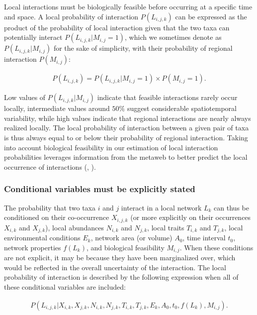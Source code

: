 Local interactions must be biologically feasible before occurring at a specific
time and space. A local probability of interaction $P(L_{i, j, k})$ can be
expressed as the product of the probability of local interaction given that the
two taxa can potentially interact $P(L_{i, j, k} | M_{i, j} = 1)$, which we
sometimes denote as $P(L_{i, j, k}|M_{i, j})$ for the sake of simplicity, with
their probability of regional interaction $P(M_{i, j})$: 

\begin{eqnarray}
  \label{eq:local_meta}
  P(L_{i, j, k}) = P(L_{i, j, k} | M_{i, j} = 1) \times P(M_{i, j} = 1).
\end{eqnarray}

Low values of $P(L_{i, j, k}|M_{i, j})$ indicate that feasible interactions
rarely occur locally, intermediate values around $50\%$ suggest considerable
spatiotemporal variability, while high values indicate that regional
interactions are nearly always realized locally. The local probability of
interaction between a given pair of taxa is thus always equal to or below their
probability of regional interaction. Taking into account biological feasibility
in our estimation of local interaction probabilities leverages information from
the metaweb to better predict the local occurrence of interactions
(\cite{Strydom2021Roadmapa}, \cite{Dansereau2024Spatially}).  

\subsubsection{Conditional variables must be explicitly stated} 

The probability that two taxa $i$ and $j$ interact in a local network $L_k$ can
thus be conditioned on their co-occurrence $X_{i,j,k}$ (or more explicitly on
their occurrences $X_{i,k}$ and $X_{j,k}$), local abundances $N_{i,k}$ and
$N_{j,k}$, local traits $T_{i,k}$ and $T_{j,k}$, local environmental conditions
$E_k$, network area (or volume) $A_0$, time interval $t_0$, network properties
$f(L_k)$, and biological feasibility $M_{i, j}$. When these conditions are not
explicit, it may be because they have been marginalized over, which would be
reflected in the overall uncertainty of the interaction. The local probability
of interaction is described by the following expression when all of these
conditional variables are included:

\begin{eqnarray}
  \label{eq:local}
  P(L_{i, j, k} | X_{i,k}, X_{j,k}, N_{i,k}, N_{j,k}, T_{i,k}, T_{j,k},
E_k, A_0, t_0, f(L_k), M_{i, j}).
\end{eqnarray}

